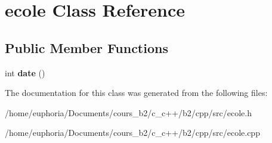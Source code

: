 \hypertarget{classecole}{}\section{ecole Class Reference}
\label{classecole}
\subsection*{Public Member Functions}
\begin{DoxyCompactItemize}
\item 
int {\bfseries date} ()\hypertarget{classecole_adf0552f647d8b560ee12b14cccc5fc68}{}\label{classecole_adf0552f647d8b560ee12b14cccc5fc68}

\end{DoxyCompactItemize}


The documentation for this class was generated from the following files\+:\begin{DoxyCompactItemize}
\item 
/home/euphoria/\+Documents/cours\+\_\+b2/c\+\_\+c++/b2/cpp/src/ecole.\+h\item 
/home/euphoria/\+Documents/cours\+\_\+b2/c\+\_\+c++/b2/cpp/src/ecole.\+cpp\end{DoxyCompactItemize}
